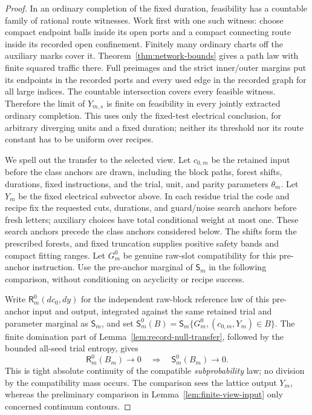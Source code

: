 \begin{proof}
In an ordinary completion of the fixed duration, feasibility has
a countable family of rational route witnesses.  Work first with
one such witness: choose compact endpoint balls inside its open
ports and a compact connecting route inside its recorded open
confinement.  Finitely many ordinary charts off the auxiliary
marks cover it.  Theorem~\ref{thm:network-bounds} gives a path
law with finite squared traffic there.  Full preimages and the
strict inner/outer margins put its endpoints in the recorded
ports and every used edge in the recorded graph for all large
indices.  The countable intersection covers every feasible
witness.  Therefore the
limit of \(Y_{m,s}\) is finite on feasibility in every jointly
extracted ordinary completion.  This uses only the fixed-test
electrical conclusion, for arbitrary diverging units and a
fixed duration; neither its threshold nor its route constant
has to be uniform over recipes.

We spell out the transfer to the selected view.  Let \(c_{0,m}\)
be the retained input before the class anchors are drawn, including
the block paths, forest shifts, durations, fixed instructions, and
the trial, unit, and parity parameters \(\theta_m\).  Let \(Y_m\)
be the fixed electrical subvector above.  In each residue trial
the code and recipe fix the requested cuts, durations, and guard/noise
search anchors before fresh letters; auxiliary choices have total
conditional weight at most one.  These search anchors precede the
class anchors considered below.  The shifts form the prescribed
forests, and fixed truncation supplies positive safety bands and
compact fitting ranges.  Let \(G_m^0\) be genuine raw-slot
compatibility for this pre-anchor instruction.  Use the pre-anchor
marginal of \(\mathsf S_m\) in the following comparison, without
conditioning on acyclicity or recipe success.

Write \(\mathsf R_m^0(dc_0,dy)\) for the independent raw-block
reference law of this pre-anchor input and output, integrated
against the same retained trial and parameter marginal as
\(\mathsf S_m\), and set
\(\mathsf S_m^0(B)=\mathsf S_m\{G_m^0,(c_{0,m},Y_m)\in B\}\).
The finite domination part of Lemma~\ref{lem:record-null-transfer},
followed by the bounded all-seed trial entropy, gives
\begin{equation}
\label{eq:pre-anchor-tac}
 \mathsf R_m^0(B_m)\longrightarrow0
 \quad\Longrightarrow\quad
 \mathsf S_m^0(B_m)\longrightarrow0.
\end{equation}
This is tight absolute continuity of the compatible
\emph{subprobability} law; no division by the compatibility mass
occurs.  The comparison sees the lattice output \(Y_m\), whereas
the preliminary comparison in Lemma~\ref{lem:finite-view-input}
only concerned continuum contours.


\end{proof}
